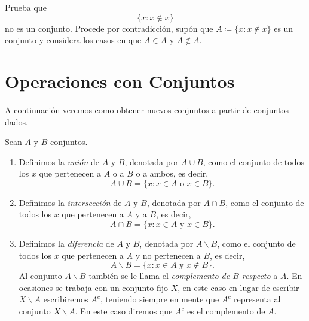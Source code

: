 \documentclass[12pt,a4paper]{book}
\begin{document}
    \begin{ejercicio}\label{ej:3}
        Prueba que
        \begin{equation*}
            \{x:x\notin x\}
        \end{equation*}
        no es un conjunto. \sugerencia Procede por contradicción, supón que
        $A\coloneqq\{x:x\notin x\}$ es un conjunto y considera los casos en que $A\in A$ y $A\notin A$.
    \end{ejercicio}

    \section{Operaciones con Conjuntos}

    A continuación veremos como obtener nuevos conjuntos a partir de conjuntos dados.

    \begin{definicion}\label{def:4}
        Sean $A$ y $B$ conjuntos.
        \begin{enumerate}
            \item Definimos la \textit{unión} de $A$ y $B$, denotada por $A\cup B$, como el conjunto de
            todos los $x$ que pertenecen a $A$ o a $B$ o a ambos, es decir,
            \begin{equation*}
                A\cup B=\{x:x\in A\text{ o }x\in B\}.
            \end{equation*}
            \item Definimos la \textit{intersección} de $A$ y $B$, denotada por $A\cap B$, como el conjunto
            de todos los $x$ que pertenecen a $A$ y a $B$, es decir,
            \begin{equation*}
                A\cap B=\{x:x\in A\text{ y }x\in B\}.
            \end{equation*}
            \item Definimos la \textit{diferencia} de $A$ y $B$, denotada por $A\backslash B$, como el conjunto
            de todos los $x$ que pertenecen a $A$ y no pertenecen a $B$, es decir,
            \begin{equation*}
                A\backslash B=\{x:x\in A\text{ y }x\notin B\}.
            \end{equation*}
            Al conjunto $A\backslash B$ también se le llama el \textit{complemento de $B$ respecto} a $A$. En
            ocasiones se trabaja con un conjunto fijo $X$, en este caso en lugar de escribir
            $X\backslash A$ escribiremos $A^{c}$, teniendo siempre en mente que $A^{c}$ representa al
            conjunto $X\backslash A$. En este caso diremos que $A^{c}$ es el complemento de $A$.
        \end{enumerate}
    \end{definicion}
\end{document}
